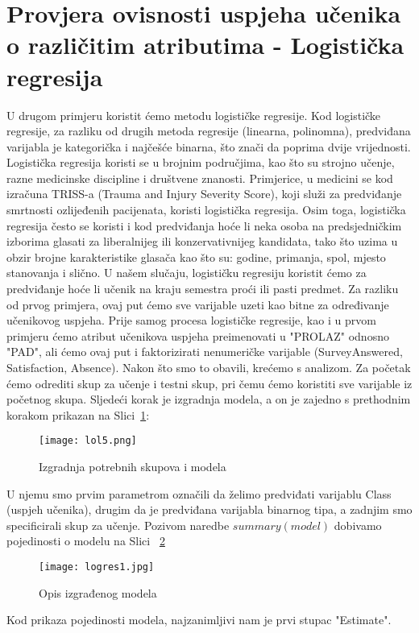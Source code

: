 \documentclass[times, utf8, zavrsni, numeric]{fer}
\begin{document}
\section{Provjera ovisnosti uspjeha učenika o različitim atributima - Logistička regresija}
U drugom primjeru koristit ćemo metodu logističke regresije. Kod logističke regresije, za razliku od drugih metoda regresije (linearna, polinomna), predviđana varijabla je kategorička i najčešće binarna, što znači da poprima dvije vrijednosti. Logistička regresija koristi se u brojnim područjima, kao što su strojno učenje, razne medicinske discipline i društvene znanosti. Primjerice, u medicini se kod izračuna TRISS-a (Trauma and Injury Severity Score), koji služi za predviđanje smrtnosti ozlijeđenih pacijenata, koristi logistička regresija. Osim toga, logistička regresija često se koristi i kod predviđanja hoće li neka osoba na predsjedničkim izborima glasati za liberalnijeg ili konzervativnijeg kandidata, tako što uzima u obzir brojne karakteristike glasača kao što su: godine, primanja, spol, mjesto stanovanja i slično. U našem slučaju, logističku regresiju koristit ćemo za predviđanje hoće li učenik na kraju semestra proći ili pasti predmet. Za razliku od prvog primjera, ovaj put ćemo sve varijable uzeti kao bitne za određivanje učenikovog uspjeha. Prije samog procesa logističke regresije, kao i u prvom primjeru ćemo atribut učenikova uspjeha preimenovati u "PROLAZ" odnosno "PAD", ali ćemo ovaj put i faktorizirati nenumeričke varijable (SurveyAnswered, Satisfaction, Absence). Nakon što smo to obavili, krećemo s analizom. Za početak ćemo odrediti skup za učenje i testni skup, pri čemu ćemo koristiti sve varijable iz početnog skupa.
Sljedeći korak je izgradnja modela, a on je zajedno s prethodnim korakom prikazan na Slici~\ref{fig:lol5}:
\begin{figure}[H]
\centering
\texttt{[image: lol5.png]}
\caption{Izgradnja potrebnih skupova i modela}
\label{fig:lol5}
\end{figure}
U njemu smo prvim parametrom označili da želimo predviđati varijablu Class (uspjeh učenika), drugim da je predviđana varijabla binarnog tipa, a zadnjim smo specificirali skup za učenje. Pozivom naredbe $summary(model)$ dobivamo pojedinosti o modelu na Slici ~\ref{fig:logres1}
\begin{figure}[H]
\centering
\texttt{[image: logres1.jpg]}
\caption{Opis izgrađenog modela}
\label{fig:logres1}
\end{figure}
Kod prikaza pojedinosti modela, najzanimljivi nam je prvi stupac "Estimate".
\end{document}
